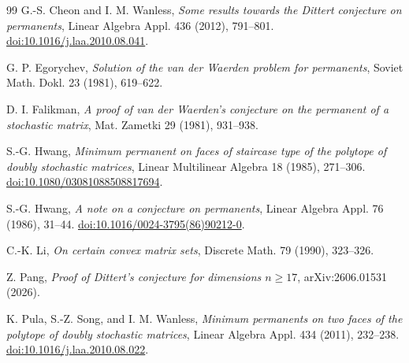 \documentclass[11pt]{article}
\theoremstyle{remark}
\begin{document}
\begin{thebibliography}{99}
G.-S. Cheon and I. M. Wanless,
\emph{Some results towards the Dittert conjecture on permanents},
Linear Algebra Appl. 436 (2012), 791--801.
\href{https://doi.org/10.1016/j.laa.2010.08.041}{doi:10.1016/j.laa.2010.08.041}.

G. P. Egorychev,
\emph{Solution of the van der Waerden problem for permanents},
Soviet Math. Dokl. 23 (1981), 619--622.

D. I. Falikman,
\emph{A proof of van der Waerden's conjecture on the permanent of a stochastic matrix},
Mat. Zametki 29 (1981), 931--938.

S.-G. Hwang,
\emph{Minimum permanent on faces of staircase type of the polytope of doubly stochastic matrices},
Linear Multilinear Algebra 18 (1985), 271--306.
\href{https://doi.org/10.1080/03081088508817694}{doi:10.1080/03081088508817694}.

S.-G. Hwang,
\emph{A note on a conjecture on permanents},
Linear Algebra Appl. 76 (1986), 31--44.
\href{https://doi.org/10.1016/0024-3795(86)90212-0}{doi:10.1016/0024-3795(86)90212-0}.

C.-K. Li,
\emph{On certain convex matrix sets},
Discrete Math. 79 (1990), 323--326.

Z. Pang,
\emph{Proof of Dittert's conjecture for dimensions $n\ge17$},
arXiv:2606.01531 (2026).

K. Pula, S.-Z. Song, and I. M. Wanless,
\emph{Minimum permanents on two faces of the polytope of doubly stochastic matrices},
Linear Algebra Appl. 434 (2011), 232--238.
\href{https://doi.org/10.1016/j.laa.2010.08.022}{doi:10.1016/j.laa.2010.08.022}.
\end{thebibliography}
\end{document}
